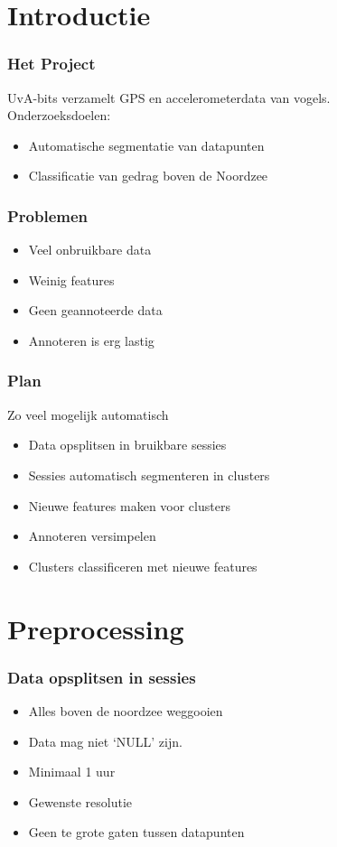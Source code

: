 \documentclass{beamer}
\title{\projectName}
\subtitle{\projectAbbreviation}
\author{Jesse Eisses, Sosha Happel, Maarten Inja and Maarten de Waard}
\institute{UvA}
\newcommand{\slide}[2]
{
\begin{frame}
\frametitle{#1} 

#2

\end{frame}
}
\begin{document}
\begin{frame}
\titlepage
\end{frame}



\section{Introductie}
\slide{Het Project}
{
UvA-bits verzamelt GPS en accelerometerdata van vogels.\\
Onderzoeksdoelen:
\begin{itemize}
	\item Automatische segmentatie van datapunten
	\item Classificatie van gedrag boven de Noordzee
\end{itemize} 
}

\slide{Problemen}
{
\begin{itemize}
	\item Veel onbruikbare data
	\item Weinig features
	\item Geen geannoteerde data
	\item Annoteren is erg lastig
\end{itemize} 
}

\slide{Plan}
{
Zo veel mogelijk automatisch
\begin{itemize}
	\item Data opsplitsen in bruikbare sessies
	\item Sessies automatisch segmenteren in clusters
	\item Nieuwe features maken voor clusters
	\item Annoteren versimpelen
	\item Clusters classificeren met nieuwe features
\end{itemize} 
}

\section{Preprocessing}
\slide{Data opsplitsen in sessies}
{
\begin{itemize}
    \item Alles boven de noordzee weggooien
    \item Data mag niet `NULL' zijn.
    \item Minimaal 1 uur
    \item Gewenste resolutie
    \item Geen te grote gaten tussen datapunten
\end{itemize}
}
\end{document}
